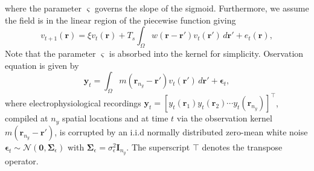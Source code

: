 \documentclass[journal,a4paper]{IEEEtran}
\begin{document}
where the parameter $\varsigma$ governs the slope of the sigmoid. Furthermore, we assume the field is in the linear region of the piecewise function giving
\begin{equation}\label{DiscreteTimeModel} 
	v_{t+1}\left(\mathbf{r}\right) = 
	\xi v_t\left(\mathbf{r}\right) + 
	T_s \int_\Omega { 
	    w\left(\mathbf{r}-\mathbf{r'}\right)
	    v_t\left(\mathbf{r}'\right) 
	\, d\mathbf{r}'} 
	+ e_t\left(\mathbf{r}\right), 
\end{equation}
Note that the parameter $\varsigma$ is absorbed into the kernel for simplicity. Oservation equation is given by 
\begin{equation}\label{eq:ObservationEquation}
	\mathbf y_t = \int_{\Omega} { m\left(\mathbf{r}_{n_y}-\mathbf{r}'\right) v_t\left(\mathbf{r}'\right) \, d\mathbf{r}'} + \boldsymbol\epsilon_t, 
\end{equation}
where electrophysiological recordings $\mathbf{y}_{t}=[y_t(\mathbf{r}_1) y_t(\mathbf{r}_2)\cdots y_t(\mathbf{r}_{n_y})]^\top$, compiled at $n_{y}$ spatial locations and at time $t$ via the observation kernel  $m\left(\mathbf{r}_{n_y}-\mathbf{r}'\right)$, is corrupted by an i.i.d normally distributed zero-mean white noise $\boldsymbol{\epsilon}_{t}\sim \mathcal{N}\left(\mathbf{0},\mathbf{\Sigma}_{\epsilon}\right)$ with $\mathbf{\Sigma}_{\epsilon}=\sigma_{\epsilon}^2\mathbf I_{n_y} $. The superscript $\top$ denotes the transpose operator.
\end{document}
